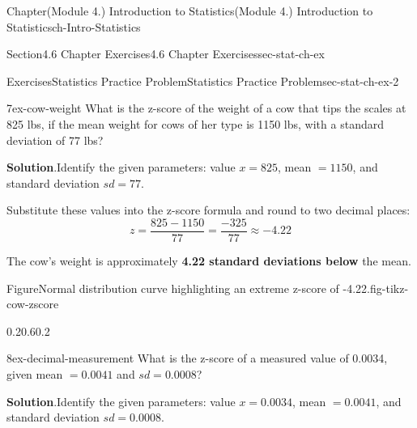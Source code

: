 \documentclass[oneside,10pt,]{book}
\newcommand{\blocktitlefont}{\relax}
\newcommand{\terminology}[1]{\textbf{#1}}
\begin{document}
\begin{chapterptx}{Chapter}{(Module 4.) Introduction to Statistics}{}{(Module 4.) Introduction to Statistics}{}{}{ch-Intro-Statistics}
\begin{sectionptx}{Section}{4.6 Chapter Exercises}{}{4.6 Chapter Exercises}{}{}{sec-stat-ch-ex}
\begin{exercises-subsection-numberless}{Exercises}{Statistics Practice Problem}{}{Statistics Practice Problem}{}{}{sec-stat-ch-ex-2}
\begin{divisionexercise}{7}{}{}{ex-cow-weight}
What is the z-score of the weight of a cow that tips the scales at 825 lbs, if the mean weight for cows of her type is 1150 lbs, with a standard deviation of 77 lbs?%
\par\smallskip%
\noindent\textbf{\blocktitlefont Solution}.\hypertarget{ex-cow-weight-2}{}\quad{}Identify the given parameters: value \(x = 825\), mean \(= 1150\), and standard deviation \(sd = 77\).%
\par
Substitute these values into the z-score formula and round to two decimal places:%
\begin{equation*}
z = \frac{825 - 1150}{77} = \frac{-325}{77} \approx -4.22
\end{equation*}
%
\par
The cow's weight is approximately \terminology{4.22 standard deviations below} the mean.%
\begin{figureptx}{Figure}{Normal distribution curve highlighting an extreme z-score of -4.22.}{fig-tikz-cow-zscore}{}%
\begin{image}{0.2}{0.6}{0.2}{}%
%
\end{image}%
\tcblower
\end{figureptx}%
\end{divisionexercise}%
\begin{divisionexercise}{8}{}{}{ex-decimal-measurement}%
What is the z-score of a measured value of 0.0034, given mean \(= 0.0041\) and \(sd = 0.0008\)?%
\par\smallskip%
\noindent\textbf{\blocktitlefont Solution}.\hypertarget{ex-decimal-measurement-2}{}\quad{}Identify the given parameters: value \(x = 0.0034\), mean \(= 0.0041\), and standard deviation \(sd = 0.0008\).%

\end{divisionexercise}
\end{exercises-subsection-numberless}
\end{sectionptx}
\end{chapterptx}
\end{document}
